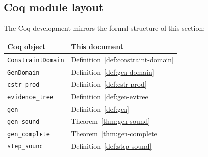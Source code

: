 \subsection{Coq module layout}
\label{sec:gen-coq-layout}

The Coq development mirrors the formal structure of this section:
\begin{center}
\begin{tabular}{ll}
  \toprule
  Coq object & This document \\
  \midrule
  \verb|ConstraintDomain|  & Definition~\ref{def:constraint-domain} \\
  \verb|GenDomain|         & Definition~\ref{def:gen-domain} \\
  \verb|cstr_prod|         & Definition~\ref{def:cstr-prod} \\
  \verb|evidence_tree|     & Definition~\ref{def:gen-evtree} \\
  \verb|gen|               & Definition~\ref{def:gen} \\
  \verb|gen_sound|         & Theorem~\ref{thm:gen-sound} \\
  \verb|gen_complete|      & Theorem~\ref{thm:gen-complete} \\
  \verb|step_sound|        & Definition~\ref{def:step-sound} \\
  \bottomrule
\end{tabular}
\end{center}
